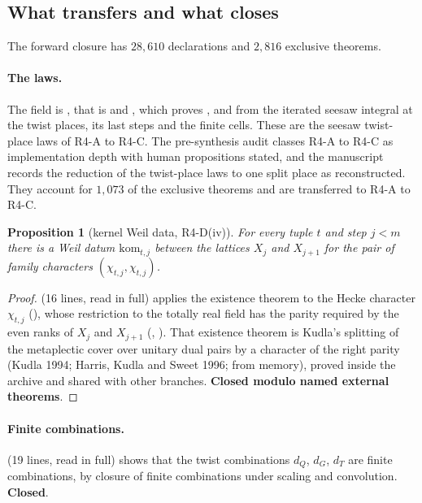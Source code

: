 \documentclass[11pt]{article}
\newcommand{\sC}{\textbf{Closed}}
\newcommand{\sE}{\textbf{Closed modulo named external theorems}}
\newtheorem{proposition}[theorem]{Proposition}
\theoremstyle{remark}
\begin{document}
\subsection{What transfers and what closes}

The forward closure has $28{,}610$ declarations and $2{,}816$ exclusive theorems.

\paragraph{The laws.} The field  is , that is  and , which proves ,  and  from the iterated seesaw integral at the twist places, its last steps and the finite cells. These are the seesaw twist-place laws of R4-A to R4-C. The pre-synthesis audit classes R4-A to R4-C as implementation depth with human propositions stated, and the manuscript records the reduction of the twist-place laws to one split place as reconstructed. They account for $1{,}073$ of the exclusive theorems and are transferred to R4-A to R4-C.

\begin{proposition}[kernel Weil data, R4-D(iv)]\label{prop:kw}
For every tuple $t$ and step $j<m$ there is a Weil datum $\mathrm{kom}_{t,j}$ between the lattices $X_j$ and $X_{j+1}$ for the pair of family characters $(\chi_{t,j},\chi_{t,j})$.
\end{proposition}

\begin{proof}
 (16 lines, read in full) applies the existence theorem  to the Hecke character $\chi_{t,j}$ (), whose restriction to the totally real field has the parity required by the even ranks of $X_j$ and $X_{j+1}$ (, ). That existence theorem is Kudla's splitting of the metaplectic cover over unitary dual pairs by a character of the right parity (Kudla 1994; Harris, Kudla and Sweet 1996; from memory), proved inside the archive and shared with other branches. \sE.
\end{proof}

\paragraph{Finite combinations.}  (19 lines, read in full) shows that the twist combinations $d_Q$, $d_G$, $d_T$ are finite combinations, by closure of finite combinations under scaling and convolution. \sC.
\end{document}
